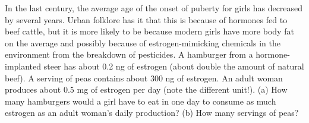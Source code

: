  In the last century, the average age of the onset of
puberty for girls has decreased by several years. Urban
folklore has it that this is because of hormones fed to beef
cattle, but it is more likely to be because modern girls
have more body fat on the average and possibly because of
estrogen-mimicking chemicals in the environment from the
breakdown of pesticides. A hamburger from a hormone-implanted
steer has about 0.2 ng of estrogen (about double the amount
of natural beef). A serving of peas contains about 300 ng of
estrogen. An adult woman produces about 0.5 mg of estrogen
per day (note the different unit!). (a) How many hamburgers
would a girl have to eat in one day to consume as much
estrogen as an adult woman's daily production? (b) How
many servings of peas? \answercheck
